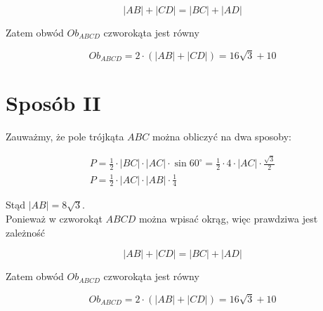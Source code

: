 \documentclass[10pt]{article}
\begin{document}
$$
|A B|+|C D|=|B C|+|A D|
$$

Zatem obwód $O b_{A B C D}$ czworokąta jest równy

$$
O b_{A B C D}=2 \cdot(|A B|+|C D|)=16 \sqrt{3}+10
$$

\section*{Sposób II}
Zauważmy, że pole trójkąta $A B C$ można obliczyć na dwa sposoby:

$$
\begin{gathered}
P=\frac{1}{2} \cdot|B C| \cdot|A C| \cdot \sin 60^{\circ}=\frac{1}{2} \cdot 4 \cdot|A C| \cdot \frac{\sqrt{3}}{2} \\
P=\frac{1}{2} \cdot|A C| \cdot|A B| \cdot \frac{1}{4}
\end{gathered}
$$

Stąd $|A B|=8 \sqrt{3}$.\\
Ponieważ w czworokąt $A B C D$ można wpisać okrąg, więc prawdziwa jest zależność

$$
|A B|+|C D|=|B C|+|A D|
$$

Zatem obwód $O b_{A B C D}$ czworokąta jest równy

$$
O b_{A B C D}=2 \cdot(|A B|+|C D|)=16 \sqrt{3}+10
$$
\end{document}
